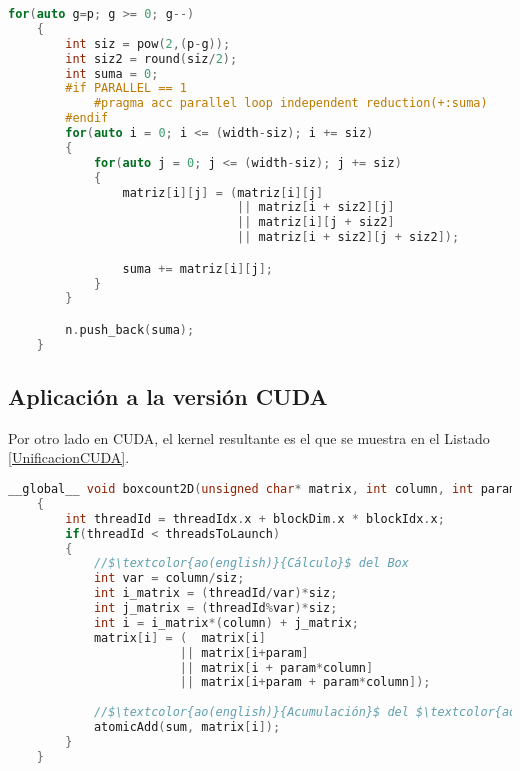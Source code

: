 \begin{lstlisting}[language=C++,caption={Optimización de unificación de bucles aplicada al Boxcount2D tanto en su versión secuencial como en su versión con OpenACC},label=UnificacionSecuencialOpenACC]
    for(auto g=p; g >= 0; g--)
    {
        int siz = pow(2,(p-g));
        int siz2 = round(siz/2);
        int suma = 0;
        #if PARALLEL == 1
            #pragma acc parallel loop independent reduction(+:suma)
        #endif
        for(auto i = 0; i <= (width-siz); i += siz)
        {
            for(auto j = 0; j <= (width-siz); j += siz)
            {
                matriz[i][j] = (matriz[i][j] 
                                || matriz[i + siz2][j] 
                                || matriz[i][j + siz2] 
                                || matriz[i + siz2][j + siz2]);

                suma += matriz[i][j];
            }
        }

        n.push_back(suma);
    }
\end{lstlisting}
\newpage
\subsection{Aplicación a la versión CUDA}
Por otro lado en CUDA, el kernel resultante es el que se muestra en el Listado \ref{UnificacionCUDA}. 

\begin{lstlisting}[language=C++,caption={Optimización de unificación de bucles aplicada al Boxcount2D CUDA},label=UnificacionCUDA]
    __global__ void boxcount2D(unsigned char* matrix, int column, int param, int siz, int threadsToLaunch, int *sum)
    {
        int threadId = threadIdx.x + blockDim.x * blockIdx.x;
        if(threadId < threadsToLaunch)
        {
            //$\textcolor{ao(english)}{Cálculo}$ del Box
            int var = column/siz;
            int i_matrix = (threadId/var)*siz;
            int j_matrix = (threadId%var)*siz;
            int i = i_matrix*(column) + j_matrix;
            matrix[i] = (  matrix[i] 
                        || matrix[i+param] 
                        || matrix[i + param*column] 
                        || matrix[i+param + param*column]);
            
            //$\textcolor{ao(english)}{Acumulación}$ del $\textcolor{ao(english)}{número}$ de boxes 
            atomicAdd(sum, matrix[i]);            
        }   
    }
\end{lstlisting}

